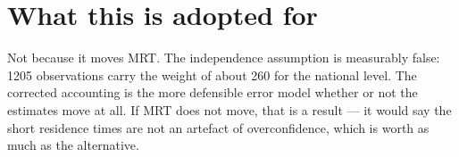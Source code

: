 \documentclass[11pt]{article}
\begin{document}
\section{What this is adopted for}

Not because it moves MRT. The independence assumption is measurably false: 1205
observations carry the weight of about 260 for the national level. The corrected
accounting is the more defensible error model whether or not the estimates move at
all. If MRT does not move, that is a result --- it would say the short residence
times are not an artefact of overconfidence, which is worth as much as the
alternative.
\end{document}
